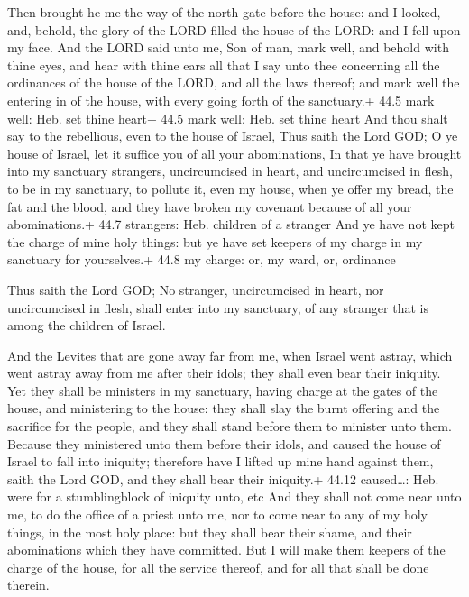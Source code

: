  Then brought he me the way of the north gate before the
house: and I looked, and, behold, the glory of the LORD filled the house
of the LORD: and I fell upon my face.  And the LORD said
unto me, Son of man, mark well, and behold with thine eyes, and hear
with thine ears all that I say unto thee concerning all the ordinances
of the house of the LORD, and all the laws thereof; and mark well the
entering in of the house, with every going forth of the sanctuary.+ 44.5
mark well: Heb. set thine heart+ 44.5 mark well: Heb. set thine heart
 And thou shalt say to the rebellious, even to the house of
Israel, Thus saith the Lord GOD; O ye house of Israel, let it suffice
you of all your abominations,  In that ye have brought into
my sanctuary strangers, uncircumcised in heart, and uncircumcised in
flesh, to be in my sanctuary, to pollute it, even my house, when ye
offer my bread, the fat and the blood, and they have broken my covenant
because of all your abominations.+ 44.7 strangers: Heb. children of a
stranger  And ye have not kept the charge of mine holy
things: but ye have set keepers of my charge in my sanctuary for
yourselves.+ 44.8 my charge: or, my ward, or, ordinance

 Thus saith the Lord GOD; No stranger, uncircumcised in
heart, nor uncircumcised in flesh, shall enter into my sanctuary, of any
stranger that is among the children of Israel.

 And the Levites that are gone away far from me, when
Israel went astray, which went astray away from me after their idols;
they shall even bear their iniquity.  Yet they shall be
ministers in my sanctuary, having charge at the gates of the house, and
ministering to the house: they shall slay the burnt offering and the
sacrifice for the people, and they shall stand before them to minister
unto them.  Because they ministered unto them before their
idols, and caused the house of Israel to fall into iniquity; therefore
have I lifted up mine hand against them, saith the Lord GOD, and they
shall bear their iniquity.+ 44.12 caused\ldots: Heb. were for a
stumblingblock of iniquity unto, etc  And they shall not
come near unto me, to do the office of a priest unto me, nor to come
near to any of my holy things, in the most holy place: but they shall
bear their shame, and their abominations which they have committed.
 But I will make them keepers of the charge of the house,
for all the service thereof, and for all that shall be done therein.

